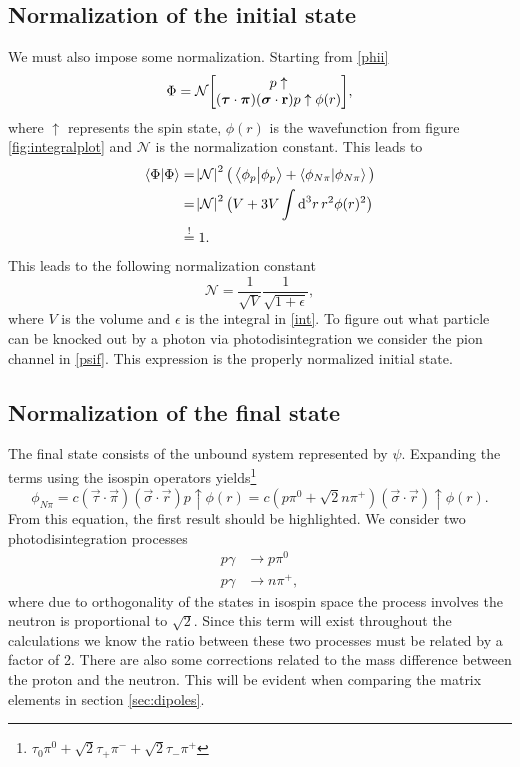 \subsection{Normalization of the initial state}\label{subsec:initial}
We must also impose some normalization. Starting from \eqref{phii}
\begin{align}
    \Phi = \mathcal{N} \mqty[p\uparrow \\ (\vec{\tau}\cdot \vec{\pi})(\vec{\sigma}\cdot \vec{r})p\uparrow \phi(r)],
\end{align}
where $\uparrow$ represents the spin state, $\phi(r)$ is the wavefunction from figure  \ref{fig:integralplot} and $\mathcal{N}$ is the normalization constant.
This leads to
\begin{align}
    \braket{\Phi}{\Phi} &= \abs{\mathcal{N}}^2 \big( \braket{\phi_p}{\phi_p}+ \braket{\phi_{N\pi}}{\phi_{N\pi}} \big) \\
    &= \abs{\mathcal{N}}^2 \big( V+3V\int \text{d}^3r \, r^2 \phi(r)^2 \big)\label{int} \\
    &\stackrel{!}{=} 1.
\end{align} 
This leads to the following normalization constant
\begin{equation}
    \mathcal{N} = \frac{1}{\sqrt{V}}\frac{1}{\sqrt{1+\epsilon}},
\end{equation}
where $V$ is the volume and $\epsilon$ is the integral in \eqref{int}. To figure out what particle can be knocked out by a photon via photodisintegration we consider the pion channel in \eqref{psif}. 
This expression is the properly normalized initial state.
\subsection{Normalization of the final state}\label{subsec:final}
The final state consists of the unbound system represented by $\psi$. Expanding the terms using the isospin operators yields\footnote{$\tau_0 \pi^0 + \sqrt{2}\tau_+\pi^-+\sqrt{2}\tau_-\pi^+$}
\begin{equation} \label{phiinitial}
    \phi_{N\pi} = c(\vec{\tau}\cdot \vec{\pi})(\vec{\sigma}\cdot \vec{r})p\uparrow \phi(r) = c(p\pi^0+\sqrt{2}n\pi^+)(\vec{\sigma}\cdot \vec{r})\uparrow \phi(r).
\end{equation}
From this equation, the first result should be highlighted. We consider two photodisintegration processes
\begin{align}
     p\gamma & \rightarrow p\pi^0 \\
     p\gamma & \rightarrow n \pi^+,
\end{align}
where due to orthogonality of the states in isospin space the process involves the neutron is proportional to $\sqrt{2}$. Since this term will exist throughout the calculations we know the ratio between these two processes must be related by a factor of 2. There are also some corrections related to the mass difference between the proton and the neutron. This will be evident when comparing the matrix elements in section \ref{sec:dipoles}. 

